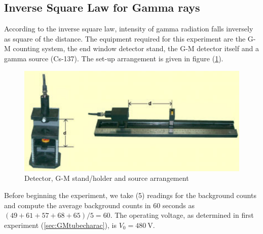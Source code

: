 \documentclass[%
 reprint,
nofootinbib,
 amsmath,amssymb,
 aps,
floatfix,
]{revtex4-2}
\begin{document}
    \subsection{Inverse Square Law for Gamma rays}
        According to the inverse square law, intensity of gamma radiation falls inversely as square of the distance. The equipment required for this experiment are the G-M counting system, the end window detector stand, the G-M detector itself and a gamma source (Cs-137). The set-up arrangement is given in figure (\ref{fig:invsqsetup}).
        \begin{figure}
            \centering
            \includegraphics[scale = 0.65]{Figures/invsq.png}
            \caption{Detector, G-M stand/holder and source arrangement}
            \label{fig:invsqsetup}
        \end{figure}
        \par
        Before beginning the experiment, we take (5) readings for the background counts and compute the average background counts in 60 seconds as $(49+61+57+68+65)/5 = 60$. The operating voltage, as determined in first experiment (\ref{sec:GMtubecharac}), is $V_0 = \SI{480}{\volt}$.
\end{document}
